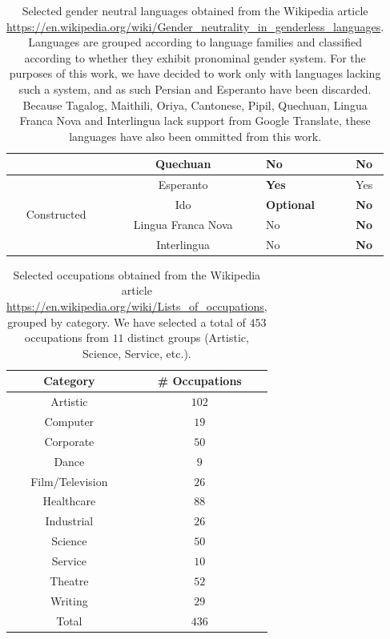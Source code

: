\documentclass{article}
\begin{document}
\begin{table}[H]
\begin{tabular}{|c|c|m{3cm}|c|}
	& Quechuan & No & \textbf{No} \\ \hline
	\multirow{4}{*}{Constructed} & Esperanto & \textbf{Yes} & Yes \\
	& Ido & \textbf{Optional} & \textbf{No} \\
	& Lingua Franca Nova & No & \textbf{No} \\
	& Interlingua & No & \textbf{No} \\ \hline
	\end{tabular}
	\label{tab:gender-neutral-languages}
	\caption{Selected gender neutral languages obtained from the Wikipedia article \url{https://en.wikipedia.org/wiki/Gender_neutrality_in_genderless_languages}. Languages are grouped according to language families and classified according to whether they exhibit pronominal gender system. For the purposes of this work, we have decided to work only with languages lacking such a system, and as such Persian and Esperanto have been discarded. Because Tagalog, Maithili, Oriya, Cantonese, Pipil, Quechuan, Lingua Franca Nova and Interlingua lack support from Google Translate, these languages have also been ommitted from this work.}
\end{table}

\begin{table}[H]
	\centering
	\begin{tabular}{|c|c|}
	\hline
	Category 		& \# Occupations 	\\ \hline \hline
	Artistic 		& $102$ 			\\ \hline
	Computer 		& $19$ 				\\ \hline
	Corporate 		& $50$ 				\\ \hline
	Dance 			& $9$ 				\\ \hline
	Film/Television & $26$ 				\\ \hline
	Healthcare 		& $88$ 				\\ \hline
	Industrial 		& $26$ 				\\ \hline
	Science 		& $50$ 				\\ \hline
	Service 		& $10$ 				\\ \hline
	Theatre 		& $52$ 				\\ \hline
	Writing 		& $29$ 				\\ \hline
	\hline
	Total			& $436$				\\ \hline
	\end{tabular}
	\label{tab:occupations}
	\caption{Selected occupations obtained from the Wikipedia article \url{https://en.wikipedia.org/wiki/Lists_of_occupations}, grouped by category. We have selected a total of $453$ occupations from $11$ distinct groups (Artistic, Science, Service, etc.).}
\end{table}
\end{document}
